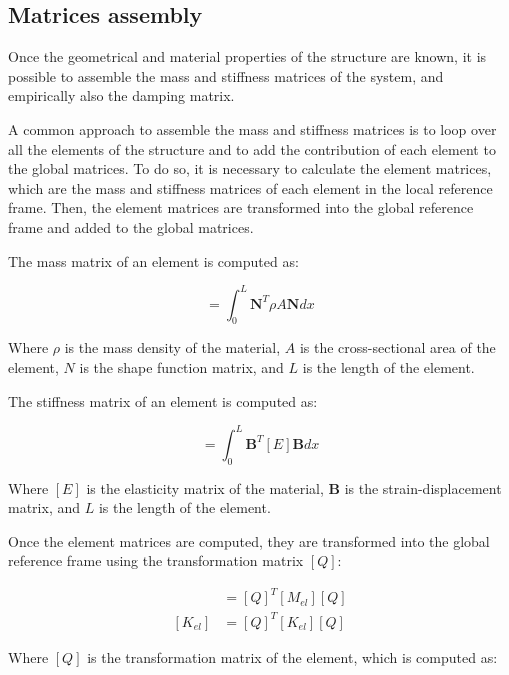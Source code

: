 \subsection{Matrices assembly}
\label{sub:matrices_assembly}

Once the geometrical and material properties of the structure are known, it is possible to assemble the mass and stiffness matrices of the system, and empirically also the damping matrix.

A common approach to assemble the mass and stiffness matrices is to loop over all the elements of the structure and to add the contribution of each element to the global matrices.
To do so, it is necessary to calculate the element matrices, which are the mass and stiffness matrices of each element in the local reference frame.
Then, the element matrices are transformed into the global reference frame and added to the global matrices.

The mass matrix of an element is computed as:

\begin{equation}
    [M_{el}] = \int_{0}^{L} \mathbf{N}^T \rho A \mathbf{N} dx
\end{equation}

Where $\rho$ is the mass density of the material, $A$ is the cross-sectional area of the element, $N$ is the shape function matrix, and $L$ is the length of the element.

The stiffness matrix of an element is computed as:

\begin{equation}
    [K_{el}] = \int_{0}^{L}  \mathbf{B}^T [E] \mathbf{B} dx
\end{equation}

Where $[E]$ is the elasticity matrix of the material, $\mathbf{B}$ is the strain-displacement matrix, and $L$ is the length of the element.

Once the element matrices are computed, they are transformed into the global reference frame using the transformation matrix $[Q]$:

\begin{align}
    [M_{el}] & = [Q]^T [M_{el}] [Q] \\
    [K_{el}] & = [Q]^T [K_{el}] [Q]
\end{align}

Where $[Q]$ is the transformation matrix of the element, which is computed as:

